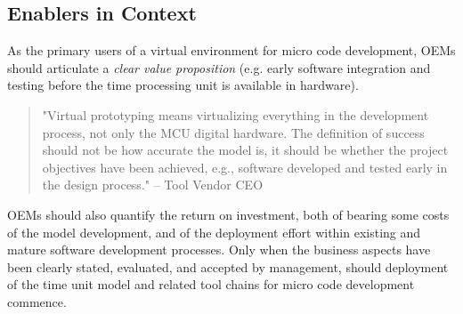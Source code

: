 

\subsection{Enablers in Context}


As the primary users of a virtual environment for micro code development, OEMs should articulate a \emph{clear value proposition} (e.g. early software integration and testing before the time processing unit is available in hardware).

\begin{quote}
"Virtual prototyping means virtualizing everything in the development process, not only the MCU digital hardware.
The definition of success should not be how accurate the model is, it should be whether the project objectives have been achieved, e.g., software developed and tested early in the design process."
-- Tool Vendor CEO
\end{quote}

OEMs should also quantify the return on investment, both of bearing some costs of the model development, and of the deployment effort within existing and mature software development processes.
Only when the business aspects have been clearly stated, evaluated, and accepted by management, should deployment of the time unit model and related tool chains for micro code development commence.



